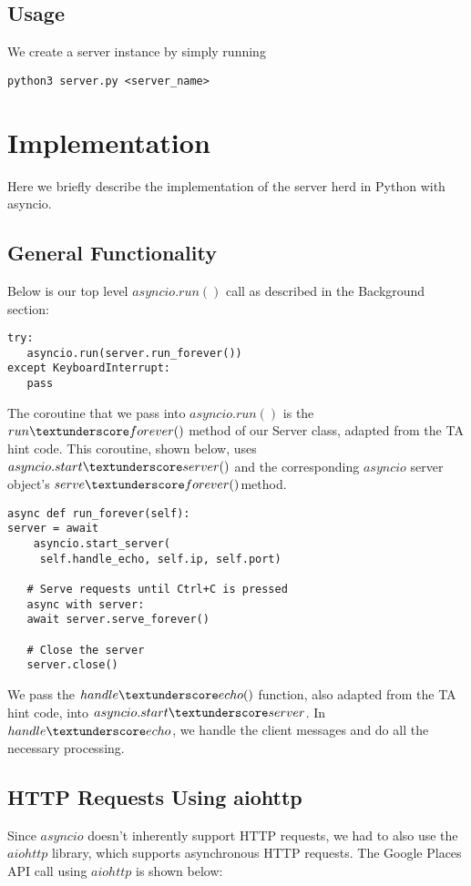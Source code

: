 \subsection{Usage}
We create a server instance by simply running 
\begin{verbatim}
python3 server.py <server_name>
\end{verbatim}

\section{Implementation}

Here we briefly describe the implementation of the server herd in Python with asyncio.

\subsection {General Functionality}
Below is our top level $asyncio.run()$ call as described in the Background section:
\begin{verbatim}
try:
   asyncio.run(server.run_forever())
except KeyboardInterrupt:
   pass
\end{verbatim}

The coroutine that we pass into $asyncio.run()$ is the $run\textunderscore forever()$ method of our Server class, 
adapted from the TA hint code. This coroutine, shown below, uses $asyncio.start\textunderscore server()$ and the 
corresponding $asyncio$ server object's $serve\textunderscore forever()$method.

\begin{verbatim}
async def run_forever(self):
server = await 
    asyncio.start_server(
     self.handle_echo, self.ip, self.port)
     
   # Serve requests until Ctrl+C is pressed
   async with server:
   await server.serve_forever()
   
   # Close the server
   server.close()
\end{verbatim}

We pass the $handle\textunderscore echo()$ function, also adapted from the TA hint code, into $asyncio.start\textunderscore server$. In $handle\textunderscore echo$, we handle the client messages and do
all the necessary processing. 

\subsection{HTTP Requests Using aiohttp}
Since $asyncio$ doesn't inherently support HTTP requests, we had to also use the $aiohttp$ library, 
which supports asynchronous HTTP requests. The Google Places API call using $aiohttp$
is shown below: 

